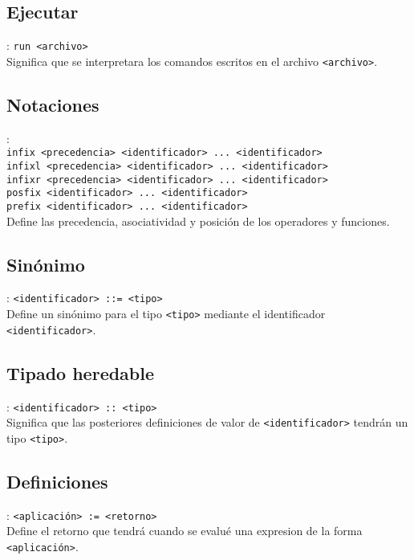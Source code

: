       \subsection*{Ejecutar}: \texttt{run~<archivo>}\\
      Significa que se interpretara los comandos escritos en el archivo \texttt{<archivo>}.
      
      \subsection*{Notaciones}:\\
      \texttt{infix~<precedencia>~<identificador>~...~<identificador>}\\
      \texttt{infixl~<precedencia>~<identificador>~...~<identificador>}\\
      \texttt{infixr~<precedencia>~<identificador>~...~<identificador>}\\
      \texttt{posfix~<identificador>~...~<identificador>}\\
      \texttt{prefix~<identificador>~...~<identificador>}
      \\
      
      Define las precedencia, asociatividad y posición de los operadores y funciones.
      
      \subsection*{Sinónimo}: \texttt{<identificador>~::=~<tipo>}\\
      Define un sinónimo para el tipo \texttt{<tipo>} mediante el identificador \texttt{<identificador>}.
      
      \subsection*{Tipado heredable}: \texttt{<identificador>~::~<tipo>}\\
      Significa que las posteriores definiciones de valor de \texttt{<identificador>} tendrán un tipo \texttt{<tipo>}.
      
      \subsection*{Definiciones}: \texttt{<aplicación>~:=~<retorno>}\\
      Define el retorno que tendrá cuando se evalué una expresion de la forma \texttt{<aplicación>}.
      
